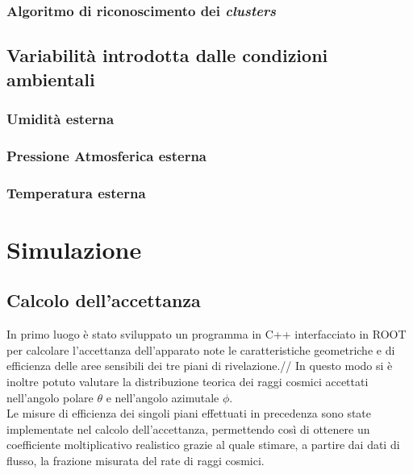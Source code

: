 \documentclass[8pt]{extarticle}
\begin{document}
\subsubsection{Algoritmo di riconoscimento dei \textit{clusters}}

\subsection{Variabilità introdotta dalle condizioni ambientali}

\subsubsection{Umidità esterna}

\subsubsection{Pressione Atmosferica esterna}

\subsubsection{Temperatura esterna}



\section{Simulazione}

\subsection{Calcolo dell'accettanza}
In primo luogo è stato sviluppato un programma in C++ interfacciato in ROOT per calcolare l’accettanza dell’apparato note le caratteristiche geometriche e di efficienza delle aree sensibili dei tre piani di rivelazione.//
In questo modo si è inoltre potuto valutare la distribuzione teorica dei raggi cosmici accettati nell’angolo polare $\theta$ e nell’angolo azimutale $\phi$. \\
Le misure di efficienza dei singoli piani effettuati in precedenza sono state implementate nel calcolo dell'accettanza, permettendo così di ottenere un coefficiente moltiplicativo realistico grazie al quale stimare, a partire dai dati di flusso, la frazione misurata del rate di raggi cosmici.


\end{document}
